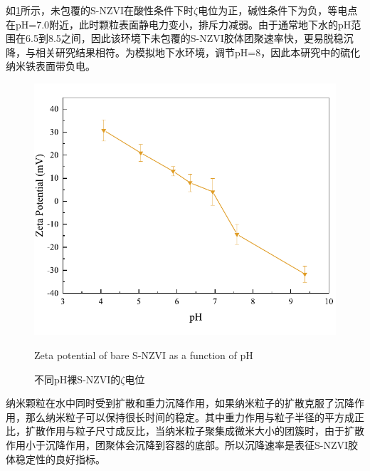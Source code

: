 


如\cref{fig3}所示，未包覆的S-NZVI在酸性条件下时$\zeta$电位为正，碱性条件下为负，等电点在pH=7.0附近，此时颗粒表面静电力变小，排斥力减弱。由于通常地下水的pH范围在6.5到8.5之间\cite{dixiashuibiaozhun}，因此该环境下未包覆的S-NZVI胶体团聚速率快，更易脱稳沉降，与相关研究结果相符。为模拟地下水环境，调节pH=8，因此本研究中的硫化纳米铁表面带负电。

\begin{figure}[h]
    \centering
    \includegraphics[scale=0.65]{figs/fig3.pdf}
    \caption{不同pH裸S-NZVI的$\zeta$电位}{Zeta potential of bare S-NZVI as a function of pH}\label{fig3}
\end{figure}


纳米颗粒在水中同时受到扩散和重力沉降作用，如果纳米粒子的扩散克服了沉降作用，那么纳米粒子可以保持很长时间的稳定。其中重力作用与粒子半径的平方成正比，扩散作用与粒子尺寸成反比，当纳米粒子聚集成微米大小的团簇时，由于扩散作用小于沉降作用，团聚体会沉降到容器的底部。所以沉降速率是表征S-NZVI胶体稳定性的良好指标。


